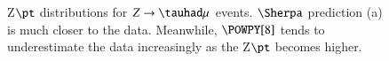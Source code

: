 \begin{figure}[htbp]
	\centering
	\hfill
	\caption{Z$\pt$ distributions for $Z\to\tauhad\mu$ events. $\Sherpa$ prediction (a) is much closer to the data. Meanwhile, $\POWPY[8]$ tends to underestimate the data increasingly as the Z$\pt$ becomes higher. }
	\label{Fig11}
\end{figure}



